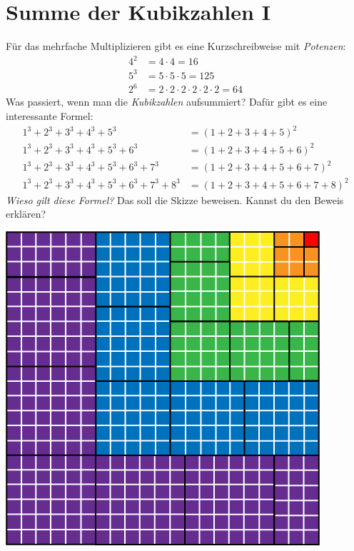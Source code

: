 \documentclass{../../zirkelblatt}
\begin{document}
\section*{Summe der Kubikzahlen I}
Für das mehrfache Multiplizieren gibt es eine Kurzschreibweise mit \emph{Potenzen}:
\begin{align*}
  4^2 &= 4 \cdot 4 = 16 \\
  5^3 &= 5 \cdot 5 \cdot 5 = 125 \\
  2^6 &= 2 \cdot 2 \cdot 2 \cdot 2 \cdot 2 \cdot 2 = 64
\end{align*}
Was passiert, wenn man die \emph{Kubikzahlen} aufsummiert? Dafür gibt es
eine interessante Formel:
\begin{align*}
  1^3 + 2^3 + 3^3 + 4^3 + 5^3 \phantom{{} + 6^3 + 7^3 + 8^3} &= (1 + 2 + 3 + 4 + 5)^2 \\
  1^3 + 2^3 + 3^3 + 4^3 + 5^3 + 6^3 \phantom{{} + 7^3 + 8^3} &= (1 + 2 + 3 + 4 + 5 + 6)^2 \\
  1^3 + 2^3 + 3^3 + 4^3 + 5^3 + 6^3 + 7^3 \phantom{{} + 8^3} &= (1 + 2 + 3 + 4 + 5 + 6 + 7)^2 \\
  1^3 + 2^3 + 3^3 + 4^3 + 5^3 + 6^3 + 7^3 + 8^3 &= (1 + 2 + 3 + 4 + 5 + 6 + 7 + 8)^2
\end{align*}
\emph{Wieso gilt diese Formel?} Das soll die Skizze beweisen. Kannst du den
Beweis erklären?
\begin{center}
\includegraphics[scale=0.7]{kubikzahlen-1}
\end{center}
\end{document}
